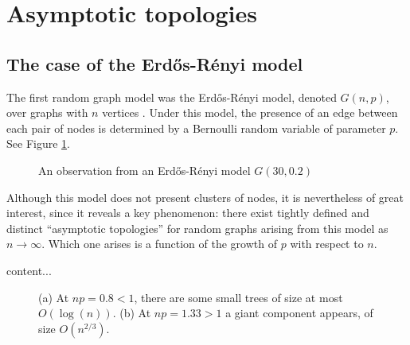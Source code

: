 \documentclass[../../main.tex]{subfiles} %
\begin{document}
\section{Asymptotic topologies}

\subsection{The case of the Erd\H{o}s-Rényi model}

The first random graph model was the Erd\H{o}s-Rényi model, denoted \(G(n, 
p)\), over graphs with \(n\) vertices \cite{erdos59a}. Under this model, the 
presence of an edge between each pair of nodes is determined by a Bernoulli 
random variable of parameter \(p\). See Figure \ref{fig:obs-erdos-renyi}. 

\begin{figure}[h]
	\centering
	\caption{An observation from an Erd\H{o}s-Rényi model \(G(30, 0.2)\)}
	\label{fig:obs-erdos-renyi}
\end{figure}

Although this model does not present clusters of nodes, it is nevertheless of 
great interest, since it reveals a key phenomenon: there exist tightly defined 
and distinct ``asymptotic topologies'' for random graphs arising from this 
model as \(n \to \infty\). Which one arises is a function of the growth of 
\(p\) with respect to \(n\).

\begin{theorem}
	content...
\end{theorem}

\begin{figure}
	\centering
	\begin{subfigure}{.55\textwidth}
		\centering
		\caption{}
		\label{fig:er-giant-0}
	\end{subfigure}
	\hfill
	\begin{subfigure}{.55\textwidth}
		\centering
		\caption{}
		\label{fig:er-giant-1}
	\end{subfigure}
	\caption{(a) At \(np = 0.8 < 1\), there are some small trees of size at 
		most \(O(\log(n))\). (b) At \(np = 1.33 > 1\) a giant component 
		appears, of 
		size \(O(n^{2/3})\).}
	\label{fig:test1}
\end{figure}
\end{document}
